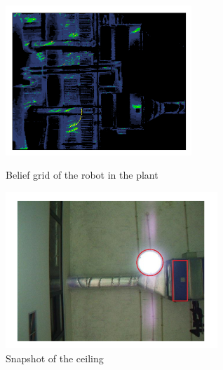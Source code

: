 \begin{figure}[!htbp]
	\centering
	\begin{minipage}{.5\textwidth}
		\centering
		\includegraphics[width = 7cm]{Pictures/beliefgrid.png}
		\caption{Belief grid of the robot in the plant}
		\label{PatternRecognition1}
	\end{minipage}%
	\begin{minipage}{.5\textwidth}
		\centering
		\includegraphics[width = 8cm]{Pictures/snapshot.png}
		\caption{Snapshot of the ceiling }
		\label{PatternRecognition2}
	\end{minipage}
\end{figure}

